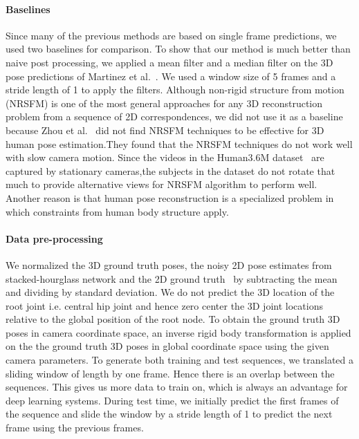 \documentclass[runningheads]{llncs}
\begin{document}
\paragraph{Baselines} 
Since many of the previous methods are based on single frame predictions, we used two baselines for comparison. To show that our method is much better than naive post processing, we applied a mean filter and a median filter on the 3D pose predictions of Martinez et al.~\cite{JMartinez:ICCV:2017}. We used a window size of 5 frames and a stride length of 1 to apply the filters. Although non-rigid structure from motion (NRSFM) is one of the most general approaches for any 3D reconstruction problem from a sequence of 2D correspondences, we did not use it as a baseline because Zhou et al.~\cite{zhou2016sparseness} did not find NRSFM techniques to be effective for 3D human pose estimation.They found that the NRSFM techniques do not work well with slow camera motion. Since the videos in the Human3.6M dataset~\cite{h36m_pami} are captured by stationary cameras,the subjects in the dataset do not rotate that much to provide alternative views for NRSFM algorithm to perform well. Another reason is that human pose reconstruction is a specialized problem in which constraints from human body structure apply.

\paragraph{Data pre-processing} 
We normalized the 3D ground truth poses, the noisy 2D pose estimates from stacked-hourglass network and the 2D ground truth~\cite{stacked-hourglass} by subtracting the mean and dividing by standard deviation. We do not predict the 3D location of the root joint i.e. central hip joint and hence zero center the 3D joint locations relative to the global position of the root node. To obtain the ground truth 3D poses in camera coordinate space, an inverse rigid body transformation is applied on the the ground truth 3D poses in global coordinate space using the given camera parameters.  
To generate both training and test sequences, we translated a sliding window of length  by one frame. Hence there is an overlap between the sequences. This gives us more data to train on, which is always an advantage for deep learning systems. During test time, we initially predict the first  frames of the sequence and slide the window by a stride length of 1 to predict the next frame using the previous frames.
\end{document}
